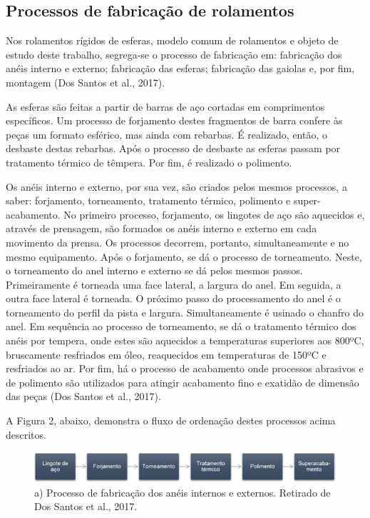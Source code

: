 \documentclass[
	12pt,				
	oneside,			
	a4paper,			
	english,			
	brazil				
	]{abntex2ppgsi}
\begin{document}
\subsection{\textbf{Processos de fabricação de rolamentos}}

Nos rolamentos rígidos de esferas, modelo comum de rolamentos e objeto de estudo deste trabalho, segrega-se o processo de fabricação em: fabricação dos anéis interno e externo; fabricação das esferas; fabricação das gaiolas e, por fim, montagem (Dos Santos et al., 2017).   

As esferas são feitas a partir de barras de aço cortadas em comprimentos específicos. Um processo de forjamento destes fragmentos de barra confere às peças um formato esférico, mas ainda com rebarbas. É realizado, então, o desbaste destas rebarbas. Após o processo de desbaste as esferas passam por tratamento térmico de têmpera. Por fim, é realizado o polimento. 

Os anéis interno e externo, por sua vez, são criados pelos mesmos processos, a saber: forjamento, torneamento, tratamento térmico, polimento e super-acabamento. No  primeiro processo, forjamento, os lingotes de aço são aquecidos e, através de prensagem, são formados os anéis interno e externo em cada movimento da prensa. Os processos decorrem, portanto, simultaneamente e no mesmo equipamento. Após o forjamento, se dá o processo de torneamento. Neste, o torneamento do anel interno e externo se dá pelos mesmos passos. Primeiramente é torneada uma face lateral, a largura do anel. Em seguida, a outra face lateral é torneada. O próximo passo do processamento do anel é o torneamento do perfil da pista e largura. Simultaneamente é usinado o chanfro do anel. Em sequência ao processo de torneamento, se dá o tratamento térmico dos anéis por tempera, onde estes são aquecidos a temperaturas superiores aos 800ºC, bruscamente resfriados em óleo, reaquecidos em temperaturas de 150ºC e resfriados ao ar. Por fim, há o processo de acabamento onde processos abrasivos e de polimento são utilizados para atingir acabamento fino e exatidão de dimensão das peças (Dos Santos et al., 2017). 

A Figura 2, abaixo, demonstra o fluxo de ordenação destes processos acima descritos.
\begin{figure}[!htb]
\centering
\includegraphics{Figura2}
\caption{a) Processo de fabricação dos anéis internos e externos. Retirado de Dos Santos et al., 2017.}
\label{Figura2}
\end{figure}
\end{document}
